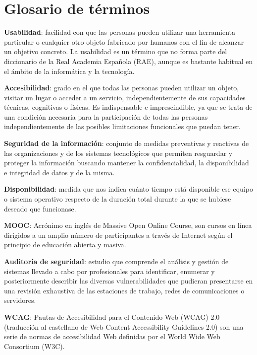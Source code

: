 \chapter{Glosario de términos}

\textbf{Usabilidad}: facilidad con que las personas pueden utilizar una herramienta particular o cualquier otro objeto fabricado por humanos con el fin de alcanzar un objetivo concreto. La usabilidad es un término que no forma parte del diccionario de la Real Academia Española (RAE), aunque es bastante habitual en el ámbito de la informática y la tecnología.
\bigskip

\textbf{Accesibilidad}: grado en el que todas las personas pueden utilizar un objeto, visitar un lugar o acceder a un servicio, independientemente de sus capacidades técnicas, cognitivas o físicas. Es indispensable e imprescindible, ya que se trata de una condición necesaria para la participación de todas las personas independientemente de las posibles limitaciones funcionales que puedan tener.
\bigskip

\textbf{Seguridad de la información}: conjunto de medidas preventivas y reactivas de las organizaciones y de los sistemas tecnológicos que permiten resguardar y proteger la información buscando mantener la confidencialidad, la disponibilidad e integridad de datos y de la misma.
\bigskip

\textbf{Disponibilidad}: medida que nos indica cuánto tiempo está disponible ese equipo o sistema operativo respecto de la duración total durante la que se hubiese deseado que funcionase.
\bigskip


\textbf{MOOC}: Acrónimo en inglés de Massive Open Online Course, son cursos en línea dirigidos a un amplio número de participantes a través de Internet según el principio de educación abierta y masiva.
\bigskip

 \textbf{Auditoría de seguridad}: estudio que comprende el análisis y gestión de sistemas llevado a cabo por profesionales para identificar, enumerar y posteriormente describir las diversas vulnerabilidades que pudieran presentarse en una revisión exhaustiva de las estaciones de trabajo, redes de comunicaciones o servidores.
\bigskip

 \textbf{WCAG}: Pautas de Accesibilidad para el Contenido Web (WCAG) 2.0 (traducción al castellano de Web Content Accessibility Guidelines 2.0) son una serie de normas de accesibilidad Web definidas por el World Wide Web Consortium (W3C).
\bigskip




